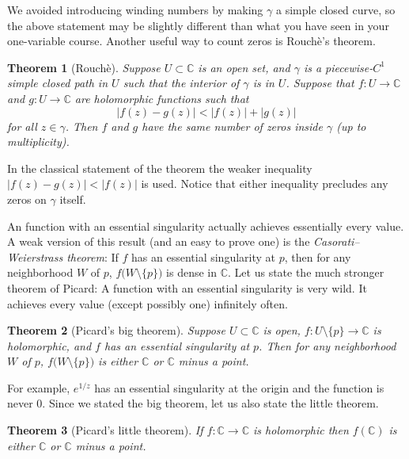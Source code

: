 \documentclass[12pt,openany]{book}
\newcommand{\sabs}[1]{\lvert {#1} \rvert}
\newcommand{\C}{{\mathbb{C}}}
\newcommand{\myindex}[1]{#1\index{#1}}
\theoremstyle{plain}
\newtheorem{thm}{Theorem}[section]
\theoremstyle{remark}
\theoremstyle{definition}
\theoremstyle{exercise}
\theoremstyle{example}
\begin{document}
We avoided introducing winding numbers by making $\gamma$ a simple closed curve,
so the above statement may be slightly different than what you have seen in
your one-variable course.
Another useful way to count zeros is Rouch\`e's theorem.

\begin{thm}[Rouch\`e]\label{thm:onevarrouche}
Suppose $U \subset \C$ is an open set, and $\gamma$ is a piecewise-$C^1$
simple closed path in $U$ such that the interior of $\gamma$ is in $U$.
Suppose that $f \colon U \to \C$ and $g \colon U \to \C$
are holomorphic functions such that
\begin{equation*}
\sabs{f(z)-g(z)} < \sabs{f(z)}+\sabs{g(z)}
\end{equation*}
for all $z \in \gamma$.  Then $f$ and $g$
have the same number of zeros
inside $\gamma$ (up to multiplicity).
\end{thm}

In the classical statement of the theorem the weaker
inequality $\sabs{f(z)-g(z)} < \sabs{f(z)}$ is used.
Notice that either inequality precludes any zeros on $\gamma$ itself.

An function with an essential singularity actually achieves essentially
every value.  A weak version of this result (and an easy to prove one)
is the \emph{\myindex{Casorati--Weierstrass theorem}}:
If $f$ has an essential singularity at $p$,
then for any neighborhood $W$ of $p$, $f\bigl(W \setminus \{p\}\bigr)$ is dense in
$\C$.  Let us state the much stronger theorem of Picard:
A function with an essential singularity is very wild.
It achieves every value (except possibly one) infinitely often.

\begin{thm}[Picard's big theorem]
Suppose $U \subset \C$ is open, $f \colon U \setminus \{ p \} \to \C$
is holomorphic, and $f$ has an essential singularity at $p$.  Then for any
neighborhood $W$ of $p$, $f\bigl(W \setminus \{ p \}\bigr)$ is either $\C$
or $\C$ minus a point.
\end{thm}

For example, $e^{1/z}$ has an essential singularity at the origin
and the function is never 0.
Since we stated the big theorem, let us also state the little theorem.

\begin{thm}[Picard's little theorem]
If $f \colon \C \to \C$ is holomorphic
then
$f(\C)$ is either $\C$ or $\C$ minus a point.
\end{thm}
\end{document}
